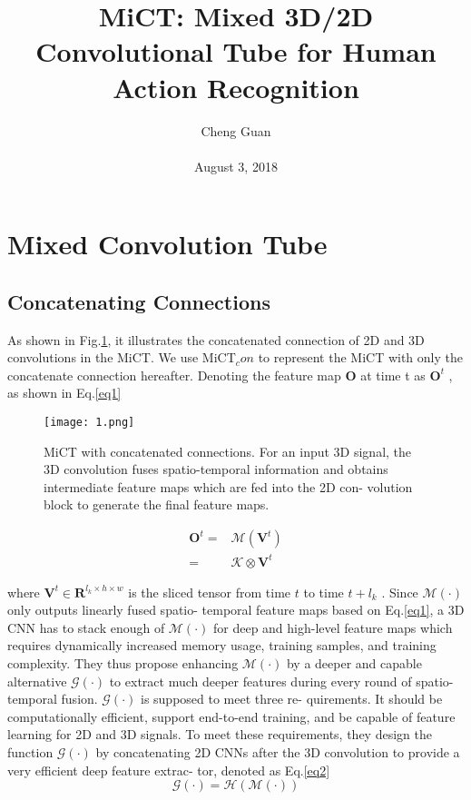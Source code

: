 \documentclass[10pt,twocolumn,letterpaper]{article}
\title{MiCT: Mixed 3D/2D Convolutional Tube for Human Action Recognition}
\author{Cheng Guan\\\\
August 3, 2018}
\begin{document}
\maketitle
\section{Mixed Convolution Tube}
\subsection{Concatenating Connections}
As shown in Fig.\ref{fig1}, it illustrates the concatenated connection of 2D and 3D convolutions in the MiCT. We use MiCT$_con$ to represent
the MiCT with only the concatenate connection hereafter.
Denoting the feature map \textbf{O} at time t as $\textbf{O}^t$ , as shown in Eq.\ref{eq1}
%
\begin{figure}[ht]
	\centering
	\texttt{[image: 1.png]}
	\caption{MiCT with concatenated connections. For an input 3D
		signal, the 3D convolution fuses spatio-temporal information and
		obtains intermediate feature maps which are fed into the 2D con-
		volution block to generate the final feature maps.}
	\label{fig1}
\end{figure}
%
\begin{equation}
	\begin{aligned}
    \textbf{O}^t=&\mathcal{M}\left(\textbf{V}^t\right)\\
    =&\mathcal{K} \otimes \textbf{V}^t  
    \end{aligned}
\label{eq1}
\end{equation}
\par
where $\textbf{V}^t \in \textbf{R}^{l_k\times h \times w}$ is the sliced tensor from time $t$ to
time $t+l_k$ . Since $\mathcal{M}\left(\cdot\right)$ only outputs linearly fused spatio-
temporal feature maps based on Eq.\ref{eq1}, a 3D CNN
has to stack enough of $\mathcal{M}\left(\cdot\right)$ for deep and high-level feature maps which requires dynamically increased memory usage, training samples, and training complexity. They thus propose enhancing $\mathcal{M}\left(\cdot\right)$ by a deeper and capable alternative $\mathcal{G}\left(\cdot\right)$ to extract much deeper features during every round
of spatio-temporal fusion. $\mathcal{G}\left(\cdot\right)$ is supposed to meet three re-
quirements. It should be computationally efficient, support
end-to-end training, and be capable of feature learning for
2D and 3D signals. To meet these requirements, they design
the function $\mathcal{G}\left(\cdot\right)$ by concatenating 2D CNNs after the 3D
convolution to provide a very efficient deep feature extrac-
tor, denoted as Eq.\ref{eq2}
\begin{equation}
	\mathcal{G}\left(\cdot\right) = \mathcal{H}\left(\mathcal{M}\left(\cdot\right)\right)
	\label{eq2}
\end{equation}
\end{document}
